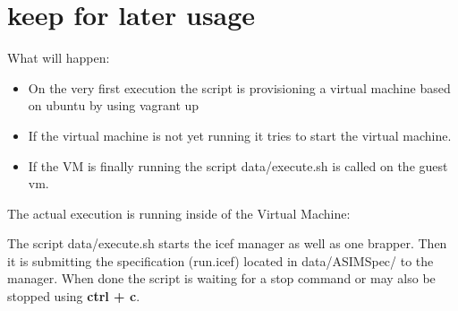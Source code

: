 \section{keep for later usage}
What will happen:
\begin{itemize}
	\item On the very first execution the script is provisioning a 
	virtual machine based on ubuntu by using vagrant up
	\item If the virtual machine is not yet running it tries to start
	the virtual machine.
	\item If the VM is finally running the script data/execute.sh is called on the guest vm.
\end{itemize}

The actual execution is running inside of the Virtual Machine:

The script data/execute.sh starts the icef manager as well as one brapper. Then it is submitting
the specification (run.icef) located in data/ASIMSpec/ to the manager. When
done the script is waiting for a stop command or may also be stopped using \textbf{ctrl + c}.


